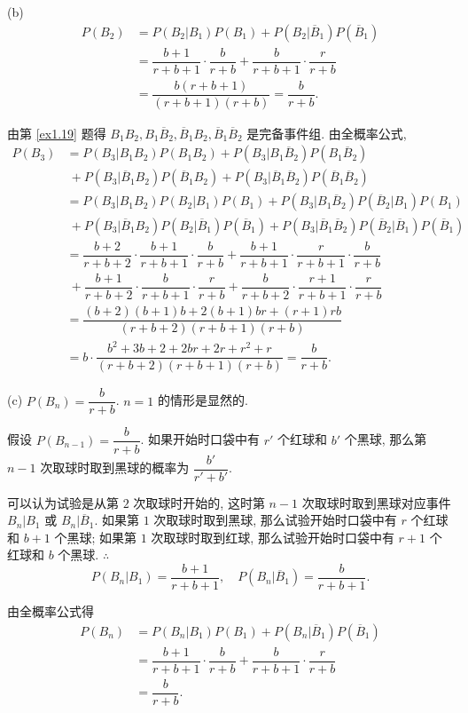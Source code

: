 \documentclass[color=black,device=normal,lang=cn]{elegantnote}
\numberwithin{equation}{section}
\theoremstyle{plain}
\numberwithin{exercise}{exsection}
\begin{document}
\begin{solution}
    (b)
    \begin{align*}
        P(B_2) & =P(B_2|B_1)P(B_1)+P(B_2|\overline{B}_1)P(\overline{B}_1) \\
        & =\dfrac{b+1}{r+b+1}\cdot\dfrac{b}{r+b}+\dfrac{b}{r+b+1}\cdot\dfrac{r}{r+b} \\
        & =\dfrac{b(r+b+1)}{(r+b+1)(r+b)}=\dfrac{b}{r+b}.
    \end{align*}

    由第 \ref{ex1.19} 题得 $B_1B_2,B_1\overline{B}_2,\overline{B}_1B_2,\overline{B}_1\overline{B}_2$ 是完备事件组. 由全概率公式,
    \begin{align*}
        P(B_3) & =P(B_3|B_1B_2)P(B_1B_2)+P(B_3|B_1\overline{B}_2)P(B_1\overline{B}_2) \\
        &\ +P(B_3|\overline{B}_1B_2)P(\overline{B}_1B_2)+P(B_3|\overline{B}_1\overline{B}_2)P(\overline{B}_1\overline{B}_2) \\
        & =P(B_3|B_1B_2)P(B_2|B_1)P(B_1)+P(B_3|B_1\overline{B}_2)P(\overline{B}_2|B_1)P(B_1) \\
        &\ +P(B_3|\overline{B}_1B_2)P(B_2|\overline{B}_1)P(\overline{B}_1)+P(B_3|\overline{B}_1\overline{B}_2)P(\overline{B}_2|\overline{B}_1)P(\overline{B}_1) \\
        & =\dfrac{b+2}{r+b+2}\cdot\dfrac{b+1}{r+b+1}\cdot\dfrac{b}{r+b}+\dfrac{b+1}{r+b+1}\cdot\dfrac{r}{r+b+1}\cdot\dfrac{b}{r+b} \\
        &\ +\dfrac{b+1}{r+b+2}\cdot\dfrac{b}{r+b+1}\cdot\dfrac{r}{r+b}+\dfrac{b}{r+b+2}\cdot\dfrac{r+1}{r+b+1}\cdot\dfrac{r}{r+b} \\
        & =\dfrac{(b+2)(b+1)b+2(b+1)br+(r+1)rb}{(r+b+2)(r+b+1)(r+b)} \\
        & =b\cdot\dfrac{b^2+3b+2+2br+2r+r^2+r}{(r+b+2)(r+b+1)(r+b)}=\dfrac{b}{r+b}.
    \end{align*}

    (c) $P(B_n)=\dfrac{b}{r+b}$. $n=1$ 的情形是显然的.

    假设 $P(B_{n-1})=\dfrac{b}{r+b}$. 如果开始时口袋中有 $r'$ 个红球和 $b'$ 个黑球, 那么第 $n-1$ 次取球时取到黑球的概率为 $\dfrac{b'}{r'+b'}$.

    可以认为试验是从第 $2$ 次取球时开始的, 这时第 $n-1$ 次取球时取到黑球对应事件 $B_n|B_1$ 或 $B_n|\overline{B}_1$. 如果第 $1$ 次取球时取到黑球, 那么试验开始时口袋中有 $r$ 个红球和 $b+1$ 个黑球; 如果第 $1$ 次取球时取到红球, 那么试验开始时口袋中有 $r+1$ 个红球和 $b$ 个黑球. $\therefore$
    \[P(B_n|B_1)=\dfrac{b+1}{r+b+1},\quad P(B_n|\overline{B}_1)=\dfrac{b}{r+b+1}.\]

    由全概率公式得
    \begin{align*}
        P(B_n) & =P(B_n|B_1)P(B_1)+P(B_n|\overline{B}_1)P(\overline{B}_1) \\
        & =\dfrac{b+1}{r+b+1}\cdot\dfrac{b}{r+b}+\dfrac{b}{r+b+1}\cdot\dfrac{r}{r+b} \\
        & =\dfrac{b}{r+b}.
    \end{align*}
\end{solution}
\end{document}
